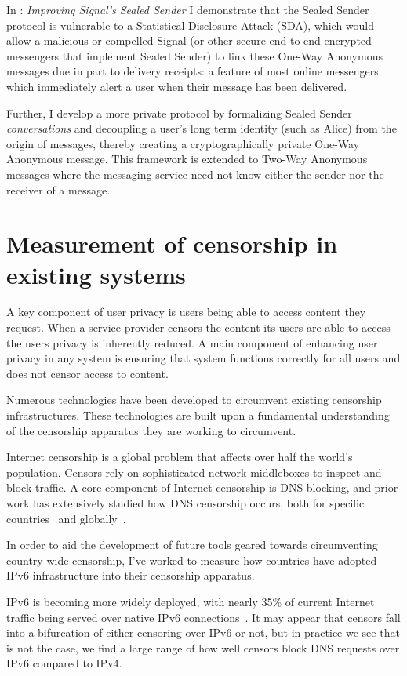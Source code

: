 In : \emph{Improving Signal's Sealed Sender} I demonstrate that
the Sealed Sender protocol is vulnerable to a Statistical Disclosure Attack
(SDA), which would allow a malicious or compelled Signal (or other secure
end-to-end encrypted messengers that implement Sealed Sender) to link these
One-Way Anonymous messages due in part to delivery receipts: a feature of most
online messengers which immediately alert a user when their message has been
delivered.

Further, I develop a more private protocol by formalizing Sealed Sender
\emph{conversations} and decoupling a user's long term identity (such as Alice)
from the origin of messages, thereby creating a cryptographically private
One-Way Anonymous message. This framework is extended to Two-Way Anonymous
messages where the messaging service need not know either the sender nor the
receiver of a message. 

\section{Measurement of censorship in existing systems}
A key component of user privacy is users being able to access content they
request. When a service provider censors the content its users are able to
access the users privacy is inherently reduced. A main component of enhancing
user privacy in any system is ensuring that system functions correctly for all
users and does not censor access to content.

Numerous technologies have been developed to circumvent existing censorship
infrastructures. These technologies are built upon a fundamental understanding
of the censorship apparatus they are working to circumvent. 

Internet censorship is a global problem that affects over half the world's
population. Censors rely on sophisticated network middleboxes to inspect and
block traffic. A core component of Internet censorship is DNS blocking, and
prior work has extensively studied how DNS censorship occurs, both for specific
countries~\cite{Anonymous2020:TripletCensors,USESEC21:GFWatch} and
globally~\cite{kuhrer2015going,dagon2008corrupted,pearce2017global,scott2016satellite}.

In order to aid the development of future tools geared towards circumventing
country wide censorship, I've worked to measure how countries have adopted IPv6
infrastructure into their censorship apparatus.

IPv6 is becoming more widely deployed, with nearly 35\% of current Internet
traffic being served over native IPv6 connections~\cite{Google-IPv6}. It may
appear that censors fall into a bifurcation of either censoring over IPv6 or
not, but in practice we see that is not the case, we find a large range of how
well censors block DNS requests over IPv6 compared to IPv4.

